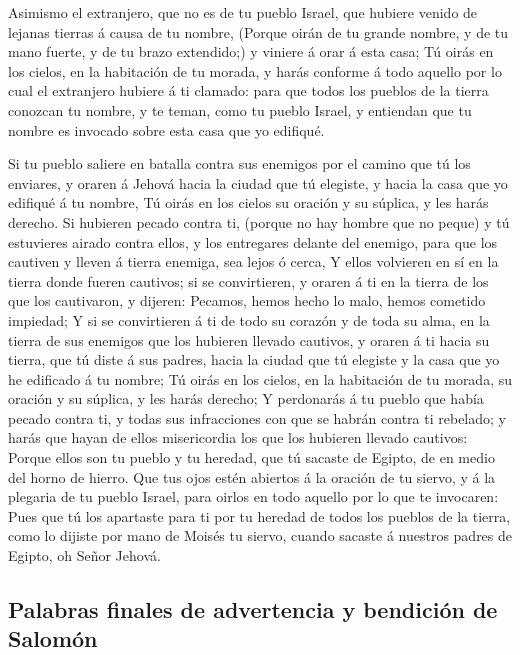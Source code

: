  Asimismo el extranjero, que no es de tu pueblo Israel, que
hubiere venido de lejanas tierras á causa de tu nombre, 
(Porque oirán de tu grande nombre, y de tu mano fuerte, y de tu brazo
extendido;) y viniere á orar á esta casa;  Tú oirás en los
cielos, en la habitación de tu morada, y harás conforme á todo aquello
por lo cual el extranjero hubiere á ti clamado: para que todos los
pueblos de la tierra conozcan tu nombre, y te teman, como tu pueblo
Israel, y entiendan que tu nombre es invocado sobre esta casa que yo
edifiqué.

 Si tu pueblo saliere en batalla contra sus enemigos por el
camino que tú los enviares, y oraren á Jehová hacia la ciudad que tú
elegiste, y hacia la casa que yo edifiqué á tu nombre,  Tú
oirás en los cielos su oración y su súplica, y les harás derecho.
 Si hubieren pecado contra ti, (porque no hay hombre que no
peque) y tú estuvieres airado contra ellos, y los entregares delante del
enemigo, para que los cautiven y lleven á tierra enemiga, sea lejos ó
cerca,  Y ellos volvieren en sí en la tierra donde fueren
cautivos; si se convirtieren, y oraren á ti en la tierra de los que los
cautivaron, y dijeren: Pecamos, hemos hecho lo malo, hemos cometido
impiedad;  Y si se convirtieren á ti de todo su corazón y
de toda su alma, en la tierra de sus enemigos que los hubieren llevado
cautivos, y oraren á ti hacia su tierra, que tú diste á sus padres,
hacia la ciudad que tú elegiste y la casa que yo he edificado á tu
nombre;  Tú oirás en los cielos, en la habitación de tu
morada, su oración y su súplica, y les harás derecho;  Y
perdonarás á tu pueblo que había pecado contra ti, y todas sus
infracciones con que se habrán contra ti rebelado; y harás que hayan de
ellos misericordia los que los hubieren llevado cautivos: 
Porque ellos son tu pueblo y tu heredad, que tú sacaste de Egipto, de en
medio del horno de hierro.  Que tus ojos estén abiertos á
la oración de tu siervo, y á la plegaria de tu pueblo Israel, para
oirlos en todo aquello por lo que te invocaren:  Pues que
tú los apartaste para ti por tu heredad de todos los pueblos de la
tierra, como lo dijiste por mano de Moisés tu siervo, cuando sacaste á
nuestros padres de Egipto, oh Señor Jehová.

\hypertarget{palabras-finales-de-advertencia-y-bendiciuxf3n-de-salomuxf3n}{%
\subsection{Palabras finales de advertencia y bendición de
Salomón}\label{palabras-finales-de-advertencia-y-bendiciuxf3n-de-salomuxf3n}}

